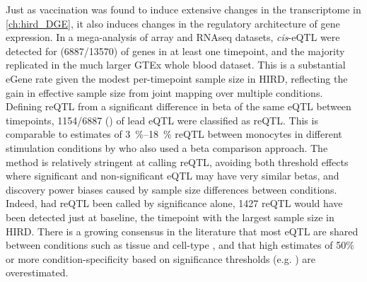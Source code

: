 Just as vaccination was found to induce extensive changes in the transcriptome
in \cref{ch:hird_DGE},
it also induces changes in the regulatory architecture of gene expression.
In a mega-analysis of array and \gls{RNAseq} datasets,
\textit{cis}-\gls{eQTL} were detected for  (\num{6887/13570}) of genes in at least one timepoint,
and the majority replicated in the much larger GTEx whole blood dataset.
This is a substantial eGene rate given the modest per-timepoint sample size in \gls{HIRD}, reflecting the gain in effective sample size from joint mapping over multiple conditions.
Defining reQTL from a significant difference in beta of the same \gls{eQTL} between timepoints,
\num{1154/6887} () of lead \gls{eQTL} were classified as \gls{reQTL}.
This is comparable to estimates of \SIrange{3}{18}{\%} \gls{reQTL} between monocytes in different stimulation conditions by \textcite{kim-hellmuth2017GeneticRegulatoryEffects} who also used a beta comparison approach.
The method is relatively stringent at calling \gls{reQTL},
avoiding both threshold effects where significant and non-significant \gls{eQTL} may have very similar betas,
and discovery power biases caused by sample size differences between conditions.
Indeed, had \gls{reQTL} been called by significance alone, 1427 \gls{reQTL} would have been detected just at baseline, the timepoint with the largest sample size in \gls{HIRD}.
There is a growing consensus in the literature that most \gls{eQTL} are shared between conditions such as tissue and cell-type \autocite{ongen2017EstimatingCausalTissues,urbut2018FlexibleStatisticalMethods,kim-hellmuth2020CellTypeSpecific},
and that high estimates of 50\% or more condition-specificity based on significance thresholds (e.g. \autocite{ackermann2013ImpactNaturalGenetic})
are overestimated.

